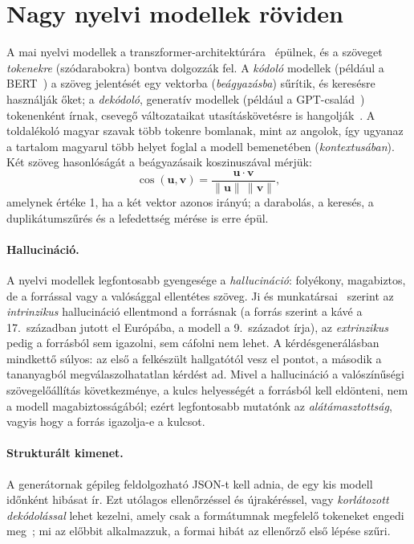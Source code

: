 \section{Nagy nyelvi modellek röviden}
\label{sec:irod-llm}

A mai nyelvi modellek a transzformer-architektúrára~\cite{vaswani2017attention} épülnek, és a szöveget
\emph{tokenekre} (szódarabokra) bontva dolgozzák fel. A \emph{kódoló} modellek (például a
BERT~\cite{devlin2019bert}) a szöveg jelentését egy vektorba (\emph{beágyazásba}) sűrítik, és keresésre
használják őket; a \emph{dekódoló}, generatív modellek (például a GPT-család~\cite{brown2020gpt3})
tokenenként írnak, csevegő változataikat utasításkövetésre is hangolják~\cite{ouyang2022instructgpt}. A
toldalékoló magyar szavak több tokenre bomlanak, mint az angolok, így ugyanaz a tartalom magyarul több
helyet foglal a modell bemenetében (\emph{kontextusában}). Két szöveg hasonlóságát a beágyazásaik
koszinuszával mérjük:
\begin{equation}
\cos(\mathbf{u},\mathbf{v})=\frac{\mathbf{u}\cdot\mathbf{v}}{\lVert\mathbf{u}\rVert\,\lVert\mathbf{v}\rVert},
\label{eq:cos}
\end{equation}
amelynek értéke 1, ha a két vektor azonos irányú; a darabolás, a keresés, a duplikátumszűrés és a
lefedettség mérése is erre épül.

\paragraph{Hallucináció.}\label{sec:irod-hall}
A nyelvi modellek legfontosabb gyengesége a \emph{hallucináció}: folyékony, magabiztos, de a forrással
vagy a valósággal ellentétes szöveg. Ji és munkatársai~\cite{ji2023hallucination} szerint az
\emph{intrinzikus} hallucináció ellentmond a forrásnak (a forrás szerint a kávé a 17.~században jutott el
Európába, a modell a 9.~századot írja), az \emph{extrinzikus} pedig a forrásból sem igazolni, sem
cáfolni nem lehet. A kérdésgenerálásban mindkettő súlyos: az első a felkészült hallgatótól vesz el pontot, a
második a tananyagból megválaszolhatatlan kérdést ad. Mivel a hallucináció a valószínűségi
szövegelőállítás következménye, a kulcs helyességét a forrásból kell eldönteni, nem a modell
magabiztosságából; ezért legfontosabb mutatónk az \emph{alátámasztottság}, vagyis hogy a forrás igazolja-e
a kulcsot.

\paragraph{Strukturált kimenet.} A generátornak gépileg feldolgozható JSON-t kell adnia, de egy kis modell
időnként hibásat ír. Ezt utólagos ellenőrzéssel és újrakéréssel, vagy \emph{korlátozott dekódolással}
lehet kezelni, amely csak a formátumnak megfelelő tokeneket engedi meg~\cite{willard2023guided}; mi az
előbbit alkalmazzuk, a formai hibát az ellenőrző első lépése szűri.

